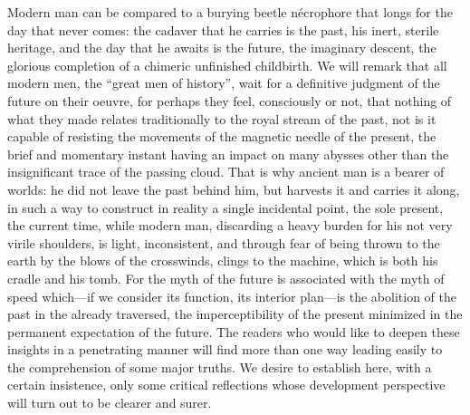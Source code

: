 Modern man can be compared to a burying beetle nécrophore that longs for the day that never comes: the cadaver that he carries is the past, his inert, sterile heritage, and the day that he awaits is the future, the imaginary descent, the glorious completion of a chimeric unfinished childbirth. We will remark that all modern men, the ``great men of history'', wait for a definitive judgment of the future on their oeuvre, for perhaps they feel, consciously or not, that nothing of what they made relates traditionally to the royal stream of the past, not is it capable of resisting the movements of the magnetic needle of the present, the brief and momentary instant having an impact on many abysses other than the insignificant trace of the passing cloud. That is why ancient man is a bearer of worlds: he did not leave the past behind him, but harvests it and carries it along, in such a way to construct in reality a single incidental point, the sole present, the current time, while modern man, discarding a heavy burden for his not very virile shoulders, is light, inconsistent, and through fear of being thrown to the earth by the blows of the crosswinds, clings to the machine, which is both his cradle and his tomb. For the myth of the future is associated with the myth of speed which---if we consider its function, its interior plan---is the abolition of the past in the already traversed, the imperceptibility of the present minimized in the permanent expectation of the future. The readers who would like to deepen these insights in a penetrating manner will find more than one way leading easily to the comprehension of some major truths. We desire to establish here, with a certain insistence, only some critical reflections whose development perspective will turn out to be clearer and surer.


